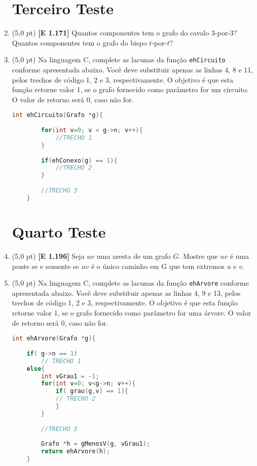 \documentclass[12pt,a4paper,oneside]{article}
\begin{document}
\begin{enumerate}
	
	\section*{Terceiro Teste}
	
	\item (5,0 pt) {\bf [E 1.171]} Quantos componentes tem o grafo do cavalo 3-por-3? Quantos componentes tem o grafo do bispo $t$-por-$t$?
	
	\item (5,0 pt) Na linguagem C, complete as lacunas da função {\tt ehCircuito} conforme apresentada abaixo. Você deve substituir apenas as linhas 4, 8 e 11, pelos trechos de código 1, 2 e 3, respectivamente. O objetivo é que esta função retorne valor 1, se o grafo fornecido como parâmetro for um circuito. O valor de retorno será 0, caso não for.
	
	\begin{lstlisting}[language=C]
	int ehCircuito(Grafo *g){
	
		for(int v=0; v < g->n; v++){
			//TRECHO 1
		}
		
		if(ehConexo(g) == 1){
			//TRECHO 2
		}
		
		//TRECHO 3
	}\end{lstlisting}
	
	\newpage
	
	\section*{Quarto Teste}
	
	\item (5,0 pt) {\bf [E 1.196]} Seja $uv$ uma aresta de um grafo $G$. Mostre que $uv$ é uma ponte se e somente se $uv$ é o único caminho em G que tem extremos $u$ e $v$.
	
	\item (5,0 pt) Na linguagem C, complete as lacunas da função {\tt ehArvore} conforme apresentada abaixo. Você deve substituir apenas as linhas 4, 9 e 13, pelos trechos de código 1, 2 e 3, respectivamente. O objetivo é que esta função retorne valor 1, se o grafo fornecido como parâmetro for uma árvore. O valor de retorno será 0, caso não for.
	
	\begin{lstlisting}[language=C]
	int ehArvore(Grafo *g){
	
	if( g->n == 1)
		// TRECHO 1
	else{
		int vGrau1 = -1;
		for(int v=0; v<g->n; v++){
			if( grau(g,v) == 1){
			// TRECHO 2
			}
		}
	
		//TRECHO 3
		
		Grafo *h = gMenosV(g, vGrau1);
		return ehArvore(h);
	}\end{lstlisting}
	
	\end{enumerate}
\end{document}
